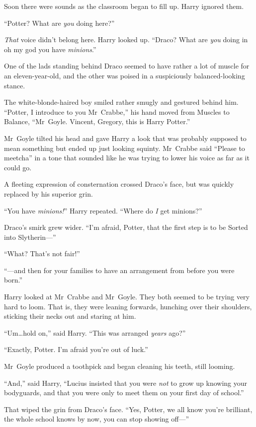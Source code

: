 Soon there were sounds as the classroom began to fill up. Harry ignored them.

“Potter? What are \emph{you} doing here?”

\emph{That} voice didn’t belong here. Harry looked up. “Draco? What are \emph{you} doing in oh my god you have \emph{minions}.”

One of the lads standing behind Draco seemed to have rather a lot of muscle for an eleven-year-old, and the other was poised in a suspiciously balanced-looking stance.

The white-blonde-haired boy smiled rather smugly and gestured behind him. “Potter, I introduce to you Mr~Crabbe,” his hand moved from Muscles to Balance, “Mr~Goyle. Vincent, Gregory, this is Harry Potter.”

Mr~Goyle tilted his head and gave Harry a look that was probably supposed to mean something but ended up just looking squinty. Mr~Crabbe said “Please to meetcha” in a tone that sounded like he was trying to lower his voice as far as it could go.

A fleeting expression of consternation crossed Draco’s face, but was quickly replaced by his superior grin.

“You have \emph{minions!}” Harry repeated. “Where do \emph{I} get minions?”

Draco’s smirk grew wider. “I’m afraid, Potter, that the first step is to be Sorted into Slytherin—”

“What? That’s not fair!”

“—and then for your families to have an arrangement from before you were born.”

Harry looked at Mr~Crabbe and Mr~Goyle. They both seemed to be trying very hard to loom. That is, they were leaning forwards, hunching over their shoulders, sticking their necks out and staring at him.

“Um…hold on,” said Harry. “This was arranged \emph{years} ago?”

“Exactly, Potter. I’m afraid you’re out of luck.”

Mr~Goyle produced a toothpick and began cleaning his teeth, still looming.

“And,” said Harry, “Lucius insisted that you were \emph{not} to grow up knowing your bodyguards, and that you were only to meet them on your first day of school.”

That wiped the grin from Draco’s face. “Yes, Potter, we all know you’re brilliant, the whole school knows by now, you can stop showing off—”

